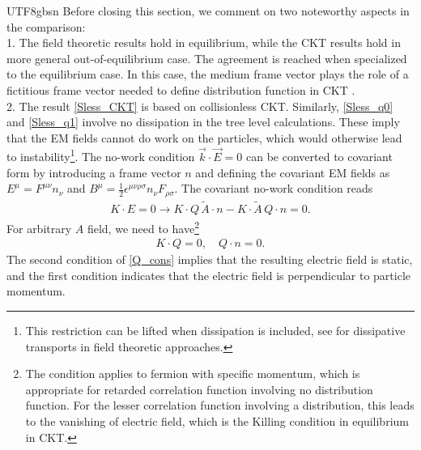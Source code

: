 \documentclass[11pt]{article}\def\baselinestretch{1.4}
\def\e{{\epsilon}}
\def\m{{\mu}}
\def\n{{\nu}}
\def\r{{\rho}}
\def\s{{\sigma}}
\begin{document}
\begin{CJK}{UTF8}{gbsn}
Before  closing this section, we comment on two noteworthy aspects in the comparison:\\
1. The field theoretic results hold in equilibrium, while the CKT results hold in more general out-of-equilibrium case. The agreement is reached when specialized to the equilibrium case. In this case, the medium frame vector plays the role of a fictitious frame vector needed to define distribution function in CKT \cite{Chen:2014cla}.\\
2. The result \eqref{Sless_CKT} is based on collisionless CKT. Similarly, \eqref{Sless_q0} and \eqref{Sless_q1} involve no dissipation in the tree level calculations. These imply that the EM fields cannot do work on the particles, which would otherwise lead to instability\footnote{This restriction can be lifted when dissipation is included, see \cite{Gagnon:2006hi,Gagnon:2007qt} for dissipative transports in field theoretic approaches.}. The no-work condition $\vec{k}\cdot\vec{E}=0$ can be converted to covariant form by introducing a frame vector $n$ and defining the covariant EM fields as $E^\m=F^{\m\n}n_\n$ and $B^\m=\frac{1}{2}\e^{\m\n\r\s}n_\n F_{\r\s}$. The covariant no-work condition reads
\begin{align}
K\cdot E=0\to K\cdot Q\, \tilde{A}\cdot n-K\cdot \tilde{A}\, Q\cdot n=0.
\end{align}
For arbitrary $A$ field, we need to have\footnote{The condition applies to fermion with specific momentum, which is appropriate for retarded correlation function involving no distribution function. For the lesser correlation function involving a distribution, this leads to the vanishing of electric field, which is the Killing condition in equilibrium in CKT.}
\begin{align}\label{Q_cons}
K\cdot Q=0,\quad Q\cdot n=0.
\end{align}
The second condition of \eqref{Q_cons} implies that the resulting electric field is static, and the first condition indicates that the electric field is perpendicular to particle momentum.



\end{CJK}
\end{document}
